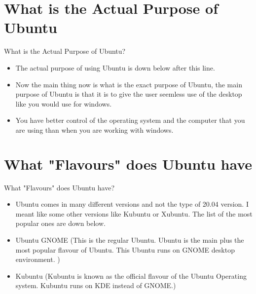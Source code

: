 \documentclass[aspectratio=43]{beamer}
\begin{document}
\section{What is the Actual Purpose of Ubuntu}
\begin{frame}{What is the Actual Purpose of Ubuntu?}
	\begin{itemize}
		\item The actual purpose of using Ubuntu is down below after this line.
		\item Now the main thing now is what is the exact purpose of Ubuntu, the main purpose of Ubuntu is that it is to give the user seemless use of the desktop like you would use for windows.
	\item You have better control of the operating system and the computer that you are using than when you are working with windows.
	\end{itemize}
\end{frame}



	\section{What "Flavours" does Ubuntu have }
	\begin{frame}{What "Flavours" does Ubuntu have?}
	\begin{block}{}
	\begin{itemize}
	\item Ubuntu comes in many different versions and not the type of 20.04 version. I meant like some other versions like Kubuntu or Xubuntu. The list of the most popular ones are down below.
	\item Ubuntu GNOME (This is the regular Ubuntu. Ubuntu is the main plus the most popular flavour of Ubuntu. This Ubuntu runs on GNOME desktop environment. )
	\item Kubuntu (Kubuntu is known as the official flavour of the Ubuntu Operating system. Kubuntu runs on KDE instead of GNOME.)
	\end{itemize}
	\end{block}
	\end{frame}
	
\end{document}
